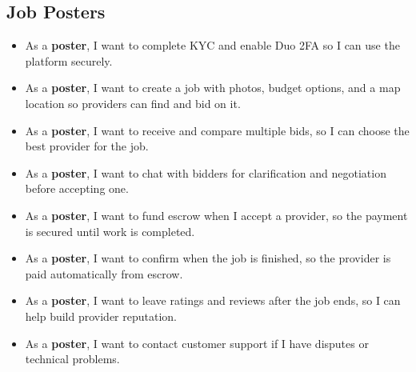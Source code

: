 \documentclass[11pt]{article}
\begin{document}
\subsection*{Job Posters}
\begin{itemize}[leftmargin=1.4em]
  \item As a \textbf{poster}, I want to complete KYC and enable Duo 2FA so I can use the platform securely.
  \item As a \textbf{poster}, I want to create a job with photos, budget options, and a map location so providers can find and bid on it.
  \item As a \textbf{poster}, I want to receive and compare multiple bids, so I can choose the best provider for the job.
  \item As a \textbf{poster}, I want to chat with bidders for clarification and negotiation before accepting one.
  \item As a \textbf{poster}, I want to fund escrow when I accept a provider, so the payment is secured until work is completed.
  \item As a \textbf{poster}, I want to confirm when the job is finished, so the provider is paid automatically from escrow.
  \item As a \textbf{poster}, I want to leave ratings and reviews after the job ends, so I can help build provider reputation.
  \item As a \textbf{poster}, I want to contact customer support if I have disputes or technical problems.
\end{itemize}
\end{document}
